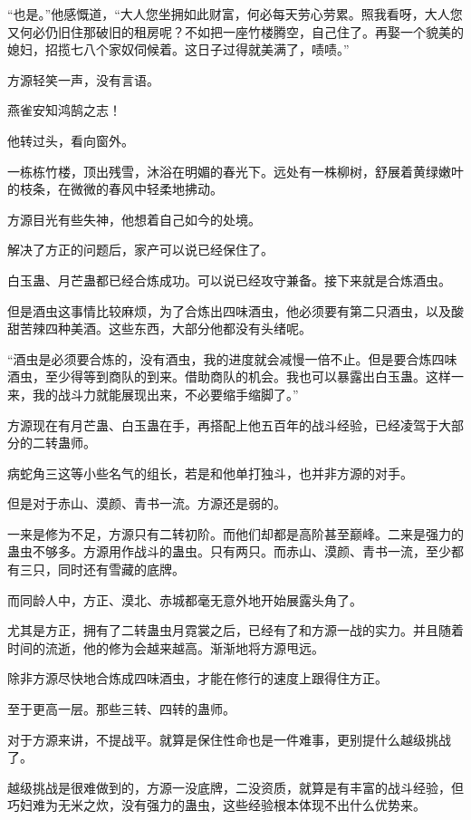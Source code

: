 \begin{this_body}
“也是。”他感慨道，“大人您坐拥如此财富，何必每天劳心劳累。照我看呀，大人您又何必仍旧住那破旧的租房呢？不如把一座竹楼腾空，自己住了。再娶一个貌美的媳妇，招揽七八个家奴伺候着。这日子过得就美满了，啧啧。”

方源轻笑一声，没有言语。

燕雀安知鸿鹄之志！

他转过头，看向窗外。

一栋栋竹楼，顶出残雪，沐浴在明媚的春光下。远处有一株柳树，舒展着黄绿嫩叶的枝条，在微微的春风中轻柔地拂动。

方源目光有些失神，他想着自己如今的处境。

解决了方正的问题后，家产可以说已经保住了。

白玉蛊、月芒蛊都已经合炼成功。可以说已经攻守兼备。接下来就是合炼酒虫。

但是酒虫这事情比较麻烦，为了合炼出四味酒虫，他必须要有第二只酒虫，以及酸甜苦辣四种美酒。这些东西，大部分他都没有头绪呢。

“酒虫是必须要合炼的，没有酒虫，我的进度就会减慢一倍不止。但是要合炼四味酒虫，至少得等到商队的到来。借助商队的机会。我也可以暴露出白玉蛊。这样一来，我的战斗力就能展现出来，不必要缩手缩脚了。”

方源现在有月芒蛊、白玉蛊在手，再搭配上他五百年的战斗经验，已经凌驾于大部分的二转蛊师。

病蛇角三这等小些名气的组长，若是和他单打独斗，也并非方源的对手。

但是对于赤山、漠颜、青书一流。方源还是弱的。

一来是修为不足，方源只有二转初阶。而他们却都是高阶甚至巅峰。二来是强力的蛊虫不够多。方源用作战斗的蛊虫。只有两只。而赤山、漠颜、青书一流，至少都有三只，同时还有雪藏的底牌。

而同龄人中，方正、漠北、赤城都毫无意外地开始展露头角了。

尤其是方正，拥有了二转蛊虫月霓裳之后，已经有了和方源一战的实力。并且随着时间的流逝，他的修为会越来越高。渐渐地将方源甩远。

除非方源尽快地合炼成四味酒虫，才能在修行的速度上跟得住方正。

至于更高一层。那些三转、四转的蛊师。

对于方源来讲，不提战平。就算是保住性命也是一件难事，更别提什么越级挑战了。

越级挑战是很难做到的，方源一没底牌，二没资质，就算是有丰富的战斗经验，但巧妇难为无米之炊，没有强力的蛊虫，这些经验根本体现不出什么优势来。


\end{this_body}
